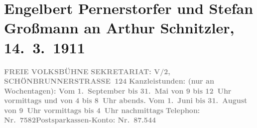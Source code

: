 

         
         \renewcommand{\erwaehntePersonen}{Personen: Stefan Großmann, Engelbert Pernerstorfer}
         \renewcommand{\erwaehnteInstitutionen}{Institutionen: Wiener Freie Volksbühne}
         \renewcommand{\erwaehnteOrte}{Orte: Schönbrunnerstraße, Wien}
         \renewcommand{\erwaehnteWerke}{Werke: Der Strom. Organ der Wiener Freien Volksbühne}
               \section[Engelbert Pernerstorfer und Stefan Großmann an Arthur Schnitzler, 14. 3. 1911]{ Engelbert Pernerstorfer und Stefan Großmann an Arthur Schnitzler,
               14. 3. 1911}\nopagebreak{}\rehead{ }\begin{ledgroupsized}[t]{13cm}\normalsize\beginnumbering \toendnotes[C]{\smallbreak\pagebreak[2]} 
\toendnotes[C]{\smallbreak}\pstart
           \noindent{}{\pb}\textcolor{gray}{\textbf{FREIE VOLKSBÜHNE}}\pend
           \pstart
           \textcolor{gray}{\textbf{SEKRETARIAT: V/2,
                           SCHÖNBRUNNERSTRASSE 124}}\pend
           \pstart
           \textcolor{gray}{\textbf{Kanzleistunden: (nur an Wochentagen): Vom 1. September bis
                     31. Mai von 9 bis 12 Uhr vormittags und von 4 bis 8 Uhr abends. Vom 1. Juni bis
                     31. August von 9 Uhr vormittags bis 4 Uhr nachmittags}}\pend
           \pstart
           \textcolor{gray}{\textbf{Telephon: Nr. 7582}}\hfill \textcolor{gray}{\textbf{Postsparkassen-Konto: Nr. 87.544}}\pend

\end{ledgroupsized}
